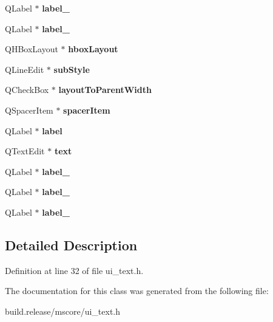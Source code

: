 \begin{DoxyCompactItemize}
\mbox{\label{class_ui___text_base_a77b1d26b369646cf87d84fa028297ab0}} 
Q\+Label $\ast$ {\bfseries label\+\_}
\item 
\mbox{\label{class_ui___text_base_a86811d8d07fbc27db2fef1194bbef44d}} 
Q\+Label $\ast$ {\bfseries label\+\_}
\item 
\mbox{\label{class_ui___text_base_a172db2bad73c06bce0c372159feaef7b}} 
Q\+H\+Box\+Layout $\ast$ {\bfseries hbox\+Layout}
\item 
\mbox{\label{class_ui___text_base_aaa2d3e74bf9415e1ac0ef33e9cfbc8b5}} 
Q\+Line\+Edit $\ast$ {\bfseries sub\+Style}
\item 
\mbox{\label{class_ui___text_base_a1d960087fa24d2a9ba34b0ac00f41efd}} 
Q\+Check\+Box $\ast$ {\bfseries layout\+To\+Parent\+Width}
\item 
\mbox{\label{class_ui___text_base_a1a9c27f4594ec13610ce4835267a091b}} 
Q\+Spacer\+Item $\ast$ {\bfseries spacer\+Item}
\item 
\mbox{\label{class_ui___text_base_aa119255ff947cdb328a02f2b8ff5d167}} 
Q\+Label $\ast$ {\bfseries label}
\item 
\mbox{\label{class_ui___text_base_af0665ae1d47efd6ccfe5e78c566e1fc3}} 
Q\+Text\+Edit $\ast$ {\bfseries text}
\item 
\mbox{\label{class_ui___text_base_adc6023209b59746b914492c1701bfab0}} 
Q\+Label $\ast$ {\bfseries label\+\_}
\item 
\mbox{\label{class_ui___text_base_af05b5f12c03b07c2c438636696a11c1e}} 
Q\+Label $\ast$ {\bfseries label\+\_}
\item 
\mbox{\label{class_ui___text_base_add66f221b5c04484d3d00e245271d025}} 
Q\+Label $\ast$ {\bfseries label\+\_}
\end{DoxyCompactItemize}


\subsection{Detailed Description}


Definition at line 32 of file ui\+\_\+text.\+h.



The documentation for this class was generated from the following file\+:\begin{DoxyCompactItemize}
\item 
build.\+release/mscore/ui\+\_\+text.\+h\end{DoxyCompactItemize}
